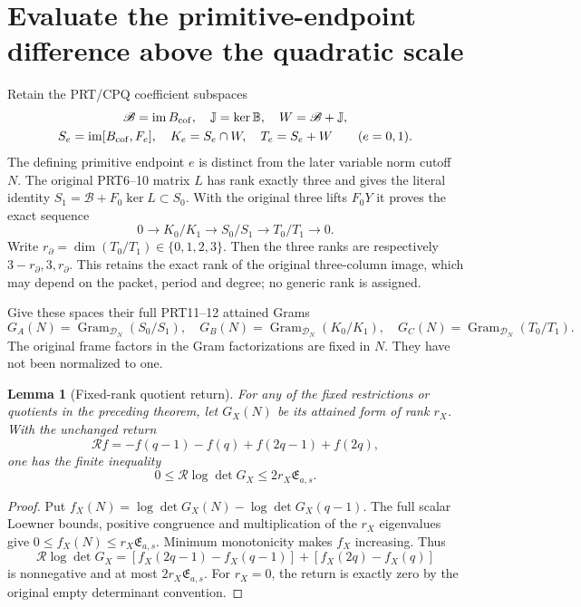 \documentclass[11pt,a4paper]{article}
\newtheorem{lemma}[theorem]{Lemma}
\DeclareMathOperator{\im}{im}
\DeclareMathOperator{\Gr}{Gram}
\begin{document}
\section{Evaluate the primitive-endpoint difference above the quadratic scale}
Retain the PRT/CPQ coefficient subspaces
\begin{equation}
\begin{gathered}
 \mathscr B=\im B_{\rm cof},\quad \mathbb J=\ker\mathbb B,\quad
 W=\mathscr B+\mathbb J,\\
 S_e=\im[B_{\rm cof},F_e],\quad K_e=S_e\cap W,\quad
 T_e=S_e+W\qquad(e=0,1).
\end{gathered}\label{peq:spaces}
\end{equation}
The defining primitive endpoint $e$ is distinct from the later variable norm cutoff $N$. The original PRT6--10 matrix $L$ has rank exactly three and gives the literal identity $S_1=\mathscr B+F_0\ker L\subset S_0$. With the original three lifts $F_0Y$ it proves the exact sequence
\begin{equation}
 0\longrightarrow K_0/K_1\longrightarrow S_0/S_1
            \longrightarrow T_0/T_1\longrightarrow0.
 \label{peq:sequence}
\end{equation}
Write $r_\partial=\dim(T_0/T_1)\in\{0,1,2,3\}$. Then the three ranks are respectively $3-r_\partial,3,r_\partial$. This retains the exact rank of the original three-column image, which may depend on the packet, period and degree; no generic rank is assigned.

Give these spaces their full PRT11--12 attained Grams
\[
 G_A(N)=\Gr_{\mathcal D_N}(S_0/S_1),\quad
 G_B(N)=\Gr_{\mathcal D_N}(K_0/K_1),\quad
 G_C(N)=\Gr_{\mathcal D_N}(T_0/T_1).
\]
The original frame factors in the Gram factorizations are fixed in $N$. They have not been normalized to one.

\begin{lemma}[Fixed-rank quotient return]
For any of the fixed restrictions or quotients in the preceding theorem, let $G_X(N)$ be its attained form of rank $r_X$. With the unchanged return
\[
 \mathcal R f=-f(q-1)-f(q)+f(2q-1)+f(2q),
\]
one has the finite inequality
\begin{equation}
 \boxed{0\le\mathcal R\log\det G_X\le2r_X\mathfrak E_{a,s}.}
 \label{peq:quotreturn}
\end{equation}
\end{lemma}
\begin{proof}
Put $f_X(N)=\log\det G_X(N)-\log\det G_X(q-1)$. The full scalar Loewner bounds, positive congruence and multiplication of the $r_X$ eigenvalues give
$0\le f_X(N)\le r_X\mathfrak E_{a,s}$. Minimum monotonicity makes $f_X$ increasing. Thus
\[
 \mathcal R\log\det G_X
       =[f_X(2q-1)-f_X(q-1)]+[f_X(2q)-f_X(q)]
\]
is nonnegative and at most $2r_X\mathfrak E_{a,s}$.
For $r_X=0$, the return is exactly zero by the original empty determinant convention.
\end{proof}
\end{document}
